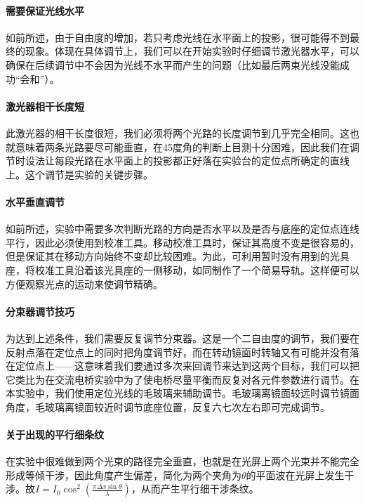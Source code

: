 \documentclass[10pt]{ctexart}
\begin{document}
\paragraph{需要保证光线水平}如前所述，由于自由度的增加，若只考虑光线在水平面上的投影，很可能得不到最终的现象。体现在具体调节上，我们可以在开始实验时仔细调节激光器水平，可以确保在后续调节中不会因为光线不水平而产生的问题（比如最后两束光线没能成功“会和”）。
\paragraph{激光器相干长度短}此激光器的相干长度很短，我们必须将两个光路的长度调节到几乎完全相同。这也就意味着两条光路要尽可能垂直，在45度角的判断上目测十分困难，因此我们在调节时设法让每段光路在水平面上的投影都正好落在实验台的定位点所确定的直线上。这个调节是实验的关键步骤。
\paragraph{水平垂直调节}如前所述，实验中需要多次判断光路的方向是否水平以及是否与底座的定位点连线平行，因此必须使用到校准工具。移动校准工具时，保证其高度不变是很容易的，但是保证其在移动方向始终不变却比较困难。为此，可利用暂时没有用到的光具座，将校准工具沿着该光具座的一侧移动，如同制作了一个简易导轨。这样便可以方便观察光点的运动来使调节精确。
\paragraph{分束器调节技巧}为达到上述条件，我们需要反复调节分束器。这是一个二自由度的调节，我们要在反射点落在定位点上的同时把角度调节好，而在转动镜面时转轴又有可能并没有落在定位点上——这意味着我们要通过多次来回调节来达到这两个目标，我们可以把它类比为在交流电桥实验中为了使电桥尽量平衡而反复对各元件参数进行调节。在本实验中，我们使用定位光线的毛玻璃来辅助调节。毛玻璃离镜面较远时调节镜面角度，毛玻璃离镜面较近时调节底座位置，反复六七次左右即可完成调节。
\paragraph{关于出现的平行细条纹}在实验中很难做到两个光束的路径完全垂直，也就是在光屏上两个光束并不能完全形成等倾干涉，因此角度产生偏差，简化为两个夹角为$\theta$的平面波在光屏上发生干涉。故$I=I_0\cos^2(\frac{\pi \Delta x\sin\theta}{\lambda})$，从而产生平行细干涉条纹。
\end{document}
